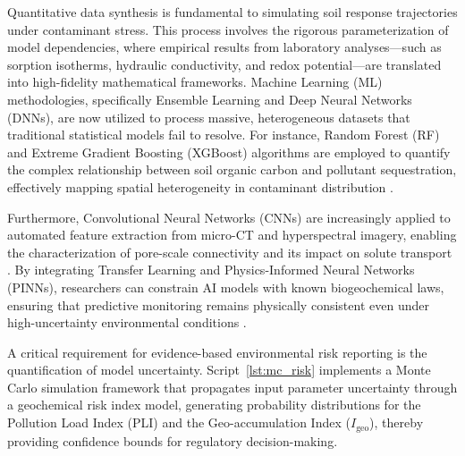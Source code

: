 \documentclass[land,article,submit,pdftex,moreauthors]{Definitions/mdpi}
\begin{document}
Quantitative data synthesis is fundamental to simulating soil response
trajectories under contaminant stress. This process involves the rigorous
parameterization of model dependencies, where empirical results from laboratory
analyses---such as sorption isotherms, hydraulic conductivity, and redox
potential---are translated into high-fidelity mathematical frameworks. Machine
Learning (ML) methodologies, specifically Ensemble Learning and Deep Neural
Networks (DNNs), are now utilized to process massive, heterogeneous datasets
that traditional statistical models fail to resolve. For instance, Random
Forest (RF) and Extreme Gradient Boosting (XGBoost) algorithms are employed
to quantify the complex relationship between soil organic carbon and pollutant
sequestration, effectively mapping spatial heterogeneity in contaminant
distribution \cite{Wadoux2024,Sahab2025}.

Furthermore, Convolutional Neural Networks (CNNs) are increasingly applied to
automated feature extraction from micro-CT and hyperspectral imagery, enabling
the characterization of pore-scale connectivity and its impact on solute
transport \cite{Demiraletal2026}. By integrating Transfer Learning and
Physics-Informed Neural Networks (PINNs), researchers can constrain AI models
with known biogeochemical laws, ensuring that predictive monitoring remains
physically consistent even under high-uncertainty environmental conditions
\cite{Karpatne2024,Nguyen2025}.

A critical requirement for evidence-based environmental risk reporting is the
quantification of model uncertainty. Script~\ref{lst:mc_risk} implements a
Monte Carlo simulation framework that propagates input parameter uncertainty
through a geochemical risk index model, generating probability distributions
for the Pollution Load Index (PLI) and the Geo-accumulation Index
($I_\mathrm{geo}$), thereby providing confidence bounds for regulatory
decision-making.
\end{document}
